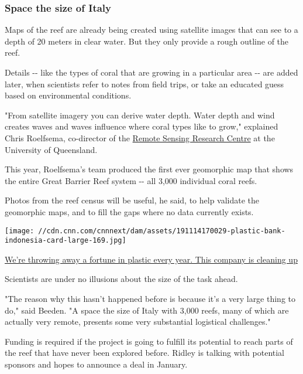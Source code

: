 \hypertarget{space-the-size-of-italy}{%
\subsubsection{Space the size of Italy}\label{space-the-size-of-italy}}

Maps of the reef are already being created using satellite images that
can see to a depth of 20 meters in clear water. But they only provide a
rough outline of the reef.

Details -\/- like the types of coral that are growing in a particular
area -\/- are added later, when scientists refer to notes from field
trips, or take an educated guess based on environmental conditions.

"From satellite imagery you can derive water depth. Water depth and wind
creates waves and waves influence where coral types like to grow,"
explained Chris Roelfsema, co-director of the
\href{https://sees.uq.edu.au/remote-sensing-research-centre}{Remote
Sensing Research Centre} at the University of Queensland.

This year, Roelfsema's team produced the first ever geomorphic map that
shows the entire Great Barrier Reef system -\/- all 3,000 individual
coral reefs.

Photos from the reef census will be useful, he said, to help validate
the geomorphic maps, and to fill the gaps where no data currently
exists.

\href{/2019/11/15/world/plastic-bank-sustainable-brands-oceans-2019/index.html}{}

\texttt{[image: //cdn.cnn.com/cnnnext/dam/assets/191114170029-plastic-bank-indonesia-card-large-169.jpg]}

\href{/2019/11/15/world/plastic-bank-sustainable-brands-oceans-2019/index.html}{We're
throwing away a fortune in plastic every year. This company is cleaning
up}

Scientists are under no illusions about the size of the task ahead.

"The reason why this hasn't happened before is because it's a very large
thing to do," said Beeden. "A space the size of Italy with 3,000 reefs,
many of which are actually very remote, presents some very substantial
logistical challenges."

Funding is required if the project is going to fulfill its potential to
reach parts of the reef that have never been explored before. Ridley is
talking with potential sponsors and hopes to announce a deal in January.

